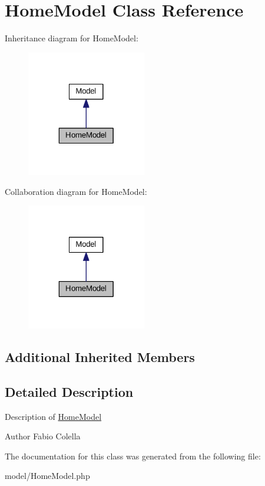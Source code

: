 \hypertarget{classHomeModel}{\section{Home\+Model Class Reference}
\label{classHomeModel}
}


Inheritance diagram for Home\+Model\+:\nopagebreak
\begin{figure}[H]
\begin{center}
\leavevmode
\includegraphics[width=148pt]{classHomeModel__inherit__graph}
\end{center}
\end{figure}


Collaboration diagram for Home\+Model\+:\nopagebreak
\begin{figure}[H]
\begin{center}
\leavevmode
\includegraphics[width=148pt]{classHomeModel__coll__graph}
\end{center}
\end{figure}
\subsection*{Additional Inherited Members}


\subsection{Detailed Description}
Description of \hyperlink{classHomeModel}{Home\+Model}

\begin{DoxyAuthor}{Author}
Fabio Colella 
\end{DoxyAuthor}


The documentation for this class was generated from the following file\+:\begin{DoxyCompactItemize}
\item 
model/Home\+Model.\+php\end{DoxyCompactItemize}
